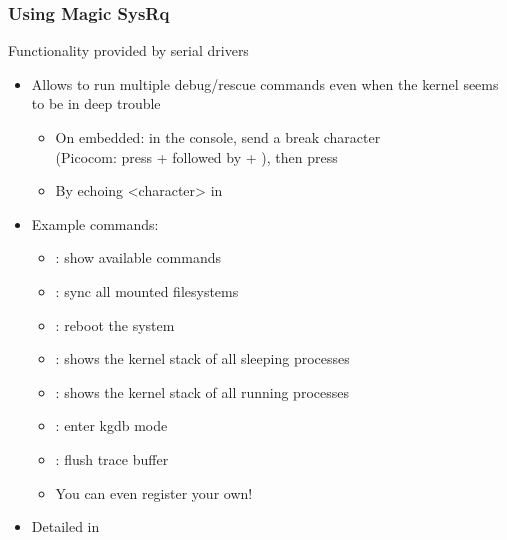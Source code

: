 \begin{frame}[fragile]
  \frametitle{Using Magic SysRq}
  Functionality provided by serial drivers
  \begin{itemize}
  \item Allows to run multiple debug/rescue commands even when the
    kernel seems to be in deep trouble
    \begin{itemize}
      \item On embedded: in the console, send a break character\\
        (Picocom: press \code{[Ctrl]} +  followed by \code{[Ctrl]}
        + \code{\ }), then press 
       \item By echoing <character> in 
    \end{itemize}
  \item Example commands:
    \begin{itemize}
    \item {}: show available commands
    \item {}: sync all mounted filesystems
    \item {}: reboot the system
    \item {}: shows the kernel stack of all sleeping processes
    \item {}: shows the kernel stack of all running processes
    \item {}: enter kgdb mode
    \item {}: flush trace buffer
    \item You can even register your own!
    \end{itemize}
  \item Detailed in 
  \end{itemize}
\end{frame}



